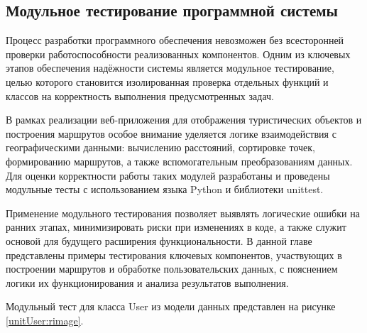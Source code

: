 \subsection{Модульное тестирование программной системы}

Процесс разработки программного обеспечения невозможен без всесторонней проверки работоспособности реализованных компонентов. Одним из ключевых этапов обеспечения надёжности системы является модульное тестирование, целью которого становится изолированная проверка отдельных функций и классов на корректность выполнения предусмотренных задач.

В рамках реализации веб-приложения для отображения туристических объектов и построения маршрутов особое внимание уделяется логике взаимодействия с географическими данными: вычислению расстояний, сортировке точек, формированию маршрутов, а также вспомогательным преобразованиям данных. Для оценки корректности работы таких модулей разработаны и проведены модульные тесты с использованием языка Python и библиотеки unittest.

Применение модульного тестирования позволяет выявлять логические ошибки на ранних этапах, минимизировать риски при изменениях в коде, а также служит основой для будущего расширения функциональности. В данной главе представлены примеры тестирования ключевых компонентов, участвующих в построении маршрутов и обработке пользовательских данных, с пояснением логики их функционирования и анализа результатов выполнения.

Модульный тест для класса User из модели данных представлен на рисунке \ref{unitUser:rimage}.


